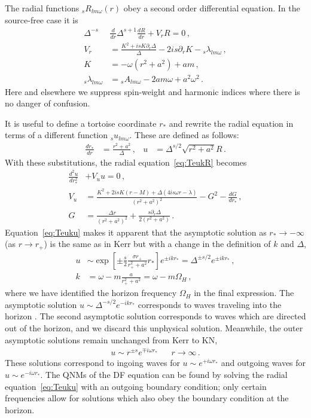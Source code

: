 \begin{refsection}
The radial functions ${}_s R_{lm\omega}(r)$ obey a second order differential equation. In the source-free case it is
\begin{align}
\label{eq:TeukR}
\Delta^{-s} & \frac{d}{dr} \Delta^{s+1} \frac{dR}{dr} + V_r R = 0 \,, \\
\label{eq:PotR}
V_r & =  \frac{K^2 + i s K \partial_r \Delta }{\Delta} - 2 i s \partial_r K - {}_s\lambda_{lm\omega} \,, \\
K & = - \omega(r^2+a^2) + am \,, \\
{}_s \lambda_{lm \omega} & = {}_sA_{lm\omega} - 2 a m \omega +a^2 \omega^2\,.
\end{align}
Here and elsewhere we suppress spin-weight and harmonic indices where there is no danger of confusion.

It is useful to define a tortoise coordinate $r_*$ and rewrite the radial equation in terms of a different function ${}_s u_{lm\omega}$. These are defined as follows:
\begin{align}
\frac{dr_*} {dr}& = \frac{r^2 +a ^2} {\Delta} \,, &   u & = \Delta^{s/2} \sqrt{r^2 +a^2} R \,.
\end{align}
With these substitutions, the radial equation~\eqref{eq:TeukR} becomes
\begin{align}
\label{eq:Teuku}
\frac{d^2 u}{dr_*^2}& + V_u u = 0 \,,\\
V_u & = \frac{K^2 + 2 i s K (r- M) + \Delta(4 i s \omega r - \lambda)}{(r^2+a^2)^2} - G^2 -\frac{dG}{dr_*} \,,\\
G & = \frac{\Delta r}{(r^2+a^2)^2} + \frac{s \partial_r \Delta}{2(r^2+a^2)} \,.
\end{align}
Equation~\eqref{eq:Teuku} makes it apparent that the asymptotic solution as $r_* \to - \infty$ (as $r\to r_+$) is the same as in Kerr but with a change in the definition of $k$ and $\Delta$,
\begin{align}
\label{eq:Ingoingu}
u &\sim \exp\left[\pm \frac{s}{2} \frac{\sigma r_+}{r_+^2 +a^2} r_* \right]e^{\pm i k r_*}  = \Delta^{\pm s/2} e^{\pm i k r_*}
 \,, \\
\label{eq:Defk}
k& = \omega - m \frac{a}{r_+^2 +a^2} = \omega - m \Omega_H \,,
\end{align}
where we have identified the horizon frequency $\Omega_H$ in the final expression. 
The asymptotic solution $u \sim \Delta^{-s/2} e^{-ikr_*}$ corresponds to waves traveling into the horizon \cite{Teukolsky1973}.
The second asymptotic solution corresponds to waves which are directed out of the horizon, and we discard this unphysical solution.
Meanwhile, the outer asymptotic solutions remain unchanged from Kerr to KN,
\begin{align}
\label{eq:Outgoingu}
u \sim r^{\pm s} e^{\mp i \omega r_*} && r \to \infty \,.
\end{align}
These solutions correspond to ingoing waves for $u\sim e^{+i\omega r_*}$ and outgoing waves for $u\sim e^{-i\omega r_*}$.
The QNMs of the DF equation can be found by solving the radial equation~\eqref{eq:Teuku} with an outgoing boundary condition; only certain frequencies allow for solutions which also obey the boundary condition at the horizon.


\end{refsection}
